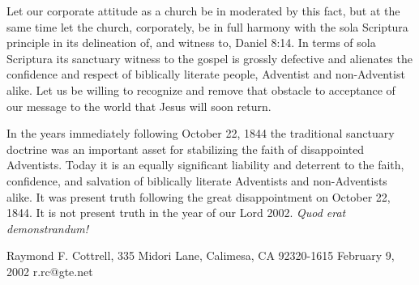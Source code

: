 Let our corporate attitude as a church be in moderated by this fact, but at
the same time let the church, corporately, be in full harmony with the sola
Scriptura principle in its delineation of, and witness to, Daniel 8:14. In
terms of sola Scriptura its sanctuary witness to the gospel is grossly
defective and alienates the confidence and respect of biblically literate
people, Adventist and non-Adventist alike. Let us be willing to recognize
and remove that obstacle to acceptance of our message to the world that
Jesus will soon return.

In the years immediately following October 22, 1844 the traditional
sanctuary doctrine was an important asset for stabilizing the faith of
disappointed Adventists. Today it is an equally significant liability and
deterrent to the faith, confidence, and salvation of biblically literate
Adventists and non-Adventists alike. It was present truth following the
great disappointment on October 22, 1844. It is not present truth in the
year of our Lord 2002. \textit{Quod erat demonstrandum!}

Raymond F. Cottrell,
335 Midori Lane, Calimesa, CA 92320-1615
February 9, 2002
r.rc@gte.net
